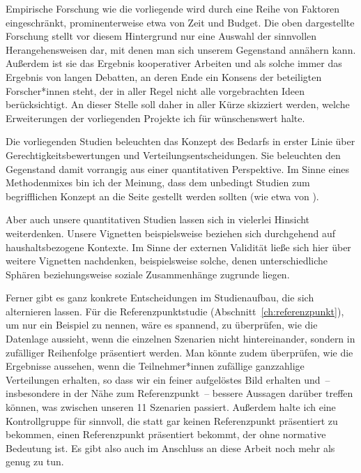 \documentclass[justified,nobib,nohyper,symmetric,twoside]{tufte-book}
\begin{document}
Empirische Forschung wie die vorliegende wird durch eine Reihe von Faktoren eingeschränkt, prominenterweise etwa von Zeit und Budget.
Die oben dargestellte Forschung stellt vor diesem Hintergrund nur eine Auswahl der sinnvollen Herangehensweisen dar, mit denen man sich unserem Gegenstand annähern kann.
Außerdem ist sie das Ergebnis kooperativer Arbeiten und als solche immer das Ergebnis von langen Debatten, an deren Ende ein Konsens der beteiligten Forscher*innen steht, der in aller Regel nicht alle vorgebrachten Ideen berücksichtigt.
An dieser Stelle soll daher in aller Kürze skizziert werden, welche Erweiterungen der vorliegenden Projekte ich für wünschenswert halte.

Die vorliegenden Studien beleuchten das Konzept des Bedarfs in erster Linie über Gerechtigkeitsbewertungen und Verteilungsentscheidungen.
Sie beleuchten den Gegenstand damit vorrangig aus einer quantitativen Perspektive.
Im Sinne eines Methodenmixes bin ich der Meinung, dass dem unbedingt Studien zum begrifflichen Konzept an die Seite gestellt werden sollten (wie etwa von \cite{poelzler_typicality_2022}).

Aber auch unsere quantitativen Studien lassen sich in vielerlei Hinsicht weiterdenken.
Unsere Vignetten beispielsweise beziehen sich durchgehend auf haushaltsbezogene Kontexte.
Im Sinne der externen Validität ließe sich hier über weitere Vignetten nachdenken, beispielsweise solche, denen unterschiedliche Sphären beziehungsweise soziale Zusammenhänge zugrunde liegen.

Ferner gibt es ganz konkrete Entscheidungen im Studienaufbau, die sich alternieren lassen.
Für die Referenzpunktstudie (Abschnitt~\ref{ch:referenzpunkt}), um nur ein Beispiel zu nennen, wäre es spannend, zu überprüfen, wie die Datenlage aussieht, wenn die einzelnen Szenarien nicht hintereinander, sondern in zufälliger Reihenfolge präsentiert werden.
Man könnte zudem überprüfen, wie die Ergebnisse aussehen, wenn die Teilnehmer*innen zufällige ganzzahlige Verteilungen erhalten, so dass wir ein feiner aufgelöstes Bild erhalten und~-- insbesondere in der Nähe zum Referenzpunkt~-- bessere Aussagen darüber treffen können, was zwischen unseren 11 Szenarien passiert. Außerdem halte ich eine Kontrollgruppe für sinnvoll, die statt gar keinen Referenzpunkt präsentiert zu bekommen, einen Referenzpunkt präsentiert bekommt, der ohne normative Bedeutung ist.
Es gibt also auch im Anschluss an diese Arbeit noch mehr als genug zu tun.


\backmatter
{}
\printbibliography[heading=bibintoc,title={Bibliographie}]
\end{document}
